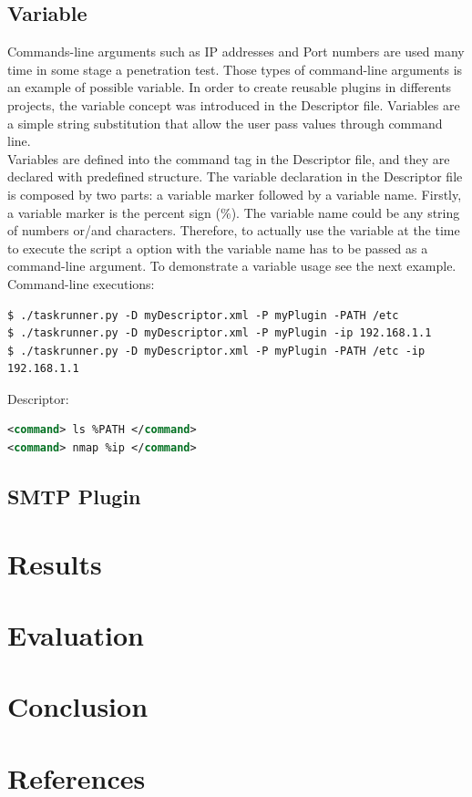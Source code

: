 \documentclass[a4paper, 12pt]{article}
\begin{document}
\subsection{Variable}

	Commands-line arguments such as IP addresses and Port numbers are used many time in some stage a penetration test. Those types of command-line
arguments is an example of possible variable. In order to create reusable plugins in differents projects, the variable concept was introduced in the
Descriptor file. Variables are a simple string substitution that allow the user pass values through command line.\\

	Variables are defined into the command tag in the Descriptor file, and they are declared with predefined structure. The variable declaration in the
Descriptor file is composed by two parts: a variable marker followed by a variable name. Firstly, a variable marker is the percent sign (\%). The variable
name could be any string of numbers or/and characters. Therefore, to actually use the variable at the time to execute the script a option with the
variable name has to be passed as a command-line argument. To demonstrate a variable usage see the next example.\\

\noindent
Command-line executions:
\begin{lstlisting}
$ ./taskrunner.py -D myDescriptor.xml -P myPlugin -PATH /etc
$ ./taskrunner.py -D myDescriptor.xml -P myPlugin -ip 192.168.1.1
$ ./taskrunner.py -D myDescriptor.xml -P myPlugin -PATH /etc -ip 192.168.1.1 
\end{lstlisting}

\noindent
Descriptor:
\begin{lstlisting}[language=xml]
<command> ls %PATH </command>
<command> nmap %ip </command>
\end{lstlisting}

\subsection{SMTP Plugin}

\section{Results}

\section{Evaluation}

\section{Conclusion}



\newpage

\section*{References}
\end{document}
